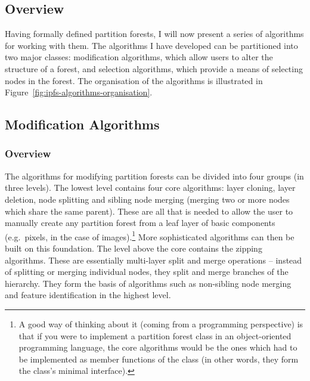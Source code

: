 \subsection{Overview}

Having formally defined partition forests, I will now present a series of algorithms for working with them. The algorithms I have developed can be partitioned into two major classes: modification algorithms, which allow users to alter the structure of a forest, and selection algorithms, which provide a means of selecting nodes in the forest. The organisation of the algorithms is illustrated in Figure~\ref{fig:ipfs-algorithms-organisation}.


\subsection{Modification Algorithms}

\subsubsection{Overview}

The algorithms for modifying partition forests can be divided into four groups (in three levels). The lowest level contains four core algorithms: layer cloning, layer deletion, node splitting and sibling node merging (merging two or more nodes which share the same parent). These are all that is needed to allow the user to manually create any partition forest from a leaf layer of basic components (e.g.~pixels, in the case of images).\footnote{A good way of thinking about it (coming from a programming perspective) is that if you were to implement a partition forest class in an object-oriented programming language, the core algorithms would be the ones which had to be implemented as member functions of the class (in other words, they form the class's minimal interface).} More sophisticated algorithms can then be built on this foundation. The level above the core contains the zipping algorithms. These are essentially multi-layer split and merge operations -- instead of splitting or merging individual nodes, they split and merge branches of the hierarchy. They form the basis of algorithms such as non-sibling node merging and feature identification in the highest level.

